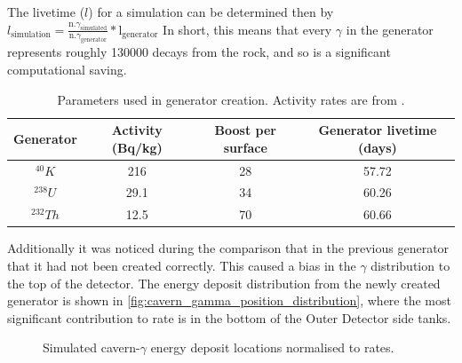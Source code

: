 \par
The livetime ($l$) for a simulation can be determined then by $l_{\text{simulation}} = \frac{\text{n.} \gamma_{\text{simulated}}}{\text{n.} \gamma_{\text{generator}}} * \text{l}_{\text{generator}}$
In short, this means that every $\gamma$ in the generator represents roughly 130000 decays from the rock, and so is a significant computational saving.


\begin{table}[!htbp]
    \centering
    \begin{tabular}{c|c|c|c}
        Generator    & Activity (Bq/kg) & Boost per surface & Generator livetime (days)  \\ \hline
        ${}^{40}K$   & 216              & 28                & 57.72                      \\
        ${}^{238}U$  & 29.1             & 34                & 60.26                      \\
        ${}^{232}Th$ & 12.5             & 70                & 60.66
    \end{tabular}
    \caption{Parameters used in generator creation. Activity rates are from \cite{LZ_Gamma_Ray_Background_ref}.}
    \label{tab:cavern_gamma_generator_parameters}
\end{table}





\par
Additionally it was noticed during the comparison that in the previous generator that it had not been created correctly.
This caused a bias in the $\gamma$ distribution to the top of the detector.
The energy deposit distribution from the newly created generator is shown in \autoref{fig:cavern_gamma_position_distribution}, where the most significant contribution to rate is in the bottom of the Outer Detector side tanks.

\begin{figure}
    \centering
    \resizebox{\textwidth}{!}{

}
    \caption{Simulated cavern-$\gamma$ energy deposit locations normalised to rates.}
    \label{fig:cavern_gamma_position_distribution}
\end{figure}
